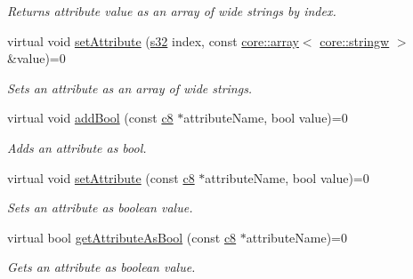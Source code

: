 \begin{DoxyCompactItemize}
\begin{DoxyCompactList}\small\item\em Returns attribute value as an array of wide strings by index. \end{DoxyCompactList}\item 
\mbox{\label{classirr_1_1io_1_1IAttributes_aa4e2e82c29e917cac49d92ac30628099}} 
virtual void \hyperlink{classirr_1_1io_1_1IAttributes_aa4e2e82c29e917cac49d92ac30628099}{set\+Attribute} (\hyperlink{namespaceirr_ac66849b7a6ed16e30ebede579f9b47c6}{s32} index, const \hyperlink{classirr_1_1core_1_1array}{core\+::array}$<$ \hyperlink{namespaceirr_1_1core_a5aedb62cb47cf01d1c548ab5e6344d2d}{core\+::stringw} $>$ \&value)=0
\begin{DoxyCompactList}\small\item\em Sets an attribute as an array of wide strings. \end{DoxyCompactList}\item 
\mbox{\label{classirr_1_1io_1_1IAttributes_a3335f912c0dfcf0e88f662796314123b}} 
virtual void \hyperlink{classirr_1_1io_1_1IAttributes_a3335f912c0dfcf0e88f662796314123b}{add\+Bool} (const \hyperlink{namespaceirr_a9395eaea339bcb546b319e9c96bf7410}{c8} $\ast$attribute\+Name, bool value)=0
\begin{DoxyCompactList}\small\item\em Adds an attribute as bool. \end{DoxyCompactList}\item 
\mbox{\label{classirr_1_1io_1_1IAttributes_a1c145485baeebae6066cee83af3a6b31}} 
virtual void \hyperlink{classirr_1_1io_1_1IAttributes_a1c145485baeebae6066cee83af3a6b31}{set\+Attribute} (const \hyperlink{namespaceirr_a9395eaea339bcb546b319e9c96bf7410}{c8} $\ast$attribute\+Name, bool value)=0
\begin{DoxyCompactList}\small\item\em Sets an attribute as boolean value. \end{DoxyCompactList}\item 
virtual bool \hyperlink{classirr_1_1io_1_1IAttributes_a197407f5b0f1d0c1aefab3e1b8d7c02d}{get\+Attribute\+As\+Bool} (const \hyperlink{namespaceirr_a9395eaea339bcb546b319e9c96bf7410}{c8} $\ast$attribute\+Name)=0
\begin{DoxyCompactList}\small\item\em Gets an attribute as boolean value. \end{DoxyCompactList}\item 

\end{DoxyCompactItemize}
